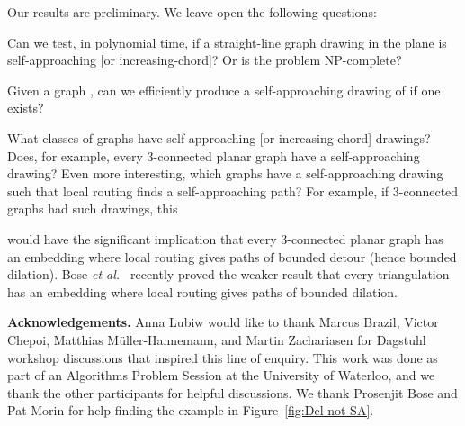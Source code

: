 \documentclass[11pt]{article}
\newcommand{\etal}{{\em et al.~}}
\newcommand{\changed}[1]{#1}
\begin{document}
Our results are preliminary.  We leave open the following questions:
\begin{itemize}
\item Can we test, in polynomial time, if a straight-line graph drawing in the plane is self-approaching [or increasing-chord]? Or is the problem NP-complete?
{\changed
\item Given a graph , can we efficiently produce a self-approaching drawing of  if one exists?


\item What classes of graphs have self-approaching [or increasing-chord] drawings? Does, for example, every 3-connected planar graph have a self-approaching drawing?  Even more interesting, which graphs have a self-approaching drawing such that
local routing finds a self-approaching path?
For example, if 3-connected graphs had such drawings, this}
would have the significant implication that every 3-connected planar graph has an embedding where local routing gives paths of bounded detour (hence bounded dilation).
Bose \etal\cite{Bose:theta6:2012} recently proved the weaker result that every triangulation has an embedding where local routing gives paths of bounded dilation.
\end{itemize}



\medskip\noindent
{\bf Acknowledgements.}  Anna Lubiw would like to thank Marcus Brazil, Victor Chepoi, Matthias M\"uller-Hannemann, and Martin Zachariasen for Dagstuhl workshop discussions that inspired this line of enquiry. This work was done as part of an Algorithms Problem Session at the University of Waterloo, and we thank the other participants for helpful discussions.  We thank Prosenjit Bose and Pat Morin for help finding the example in Figure~\ref{fig:Del-not-SA}.



\end{document}
